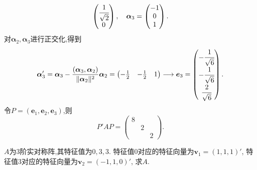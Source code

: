 \begin{solution}
\[\begin{pmatrix}
      \cfrac{1}{\sqrt{2}}\\
      0
    \end{pmatrix}, \quad
    \bm{\alpha}_3=\begin{pmatrix}
      -1\\0\\1\end{pmatrix}.
  \]
  对$\bm{\alpha}_2,\bm{\alpha}_3$进行正交化,得到
  \[
  \bm{\alpha}_3' = \bm{\alpha}_3-\frac{(\bm{\alpha}_3,\bm{\alpha}_2)}{\Vert\bm{\alpha}_2\Vert^2}\bm{\alpha}_2
  =\begin{pmatrix}
    -\frac{1}{2} & -\frac{1}{2} & 1\end{pmatrix} \longrightarrow
    \bm{e}_3 =
    \begin{pmatrix}
      -\cfrac{1}{\sqrt{6}}\\
      -\cfrac{1}{\sqrt{6}}\\
      \cfrac{2}{\sqrt{6}}
    \end{pmatrix}.
  \]
  令$P=(\bm{e}_1,\bm{e}_2,\bm{e}_3)$,则
  \[
  P'AP = \begin{pmatrix}
    8 & &\\
    & 2 & \\
    & & 2
  \end{pmatrix}.
  \]
\end{solution}

\begin{example}
  $A$为$3$阶实对称阵,其特征值为$0,3,3$.
  特征值$0$对应的特征向量为$\bm{v}_1=(1,1,1)'$,
  特征值$3$对应的特征向量为$\bm{v}_2=(-1,1,0)'$,
  求$A$.
\end{example}

